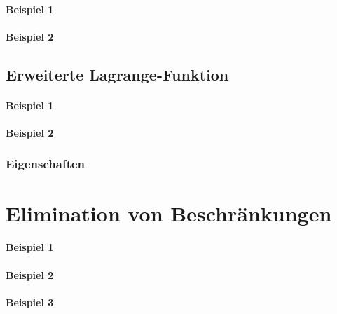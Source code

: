 			\paragraph{Beispiel 1} %

			\paragraph{Beispiel 2} %

		\subsection{Erweiterte Lagrange-Funktion} %

			\paragraph{Beispiel 1} %

			\paragraph{Beispiel 2} %

			\subsubsection{Eigenschaften} %

	\section{Elimination von Beschränkungen} %

		\paragraph{Beispiel 1} %

		\paragraph{Beispiel 2} %

		\paragraph{Beispiel 3} %

